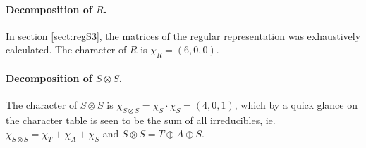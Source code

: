 \paragraph{Decomposition of $R$.} In section \ref{sect:regS3}, the matrices of the regular representation was exhaustively calculated. The character of $R$ is $\chi_R = (6,0,0)$.%
%
%
%

\paragraph{Decomposition of $S \otimes S$.} The character of $S \otimes S$ is $\chi_{S \otimes S} = \chi_S \cdot \chi_S = (4,0,1)$, which by a quick glance on the character table is seen to be the sum of all irreducibles, ie. $\chi_{S \otimes S} = \chi_T + \chi_A + \chi_S$ and $S \otimes S = T \oplus A \oplus S$.

